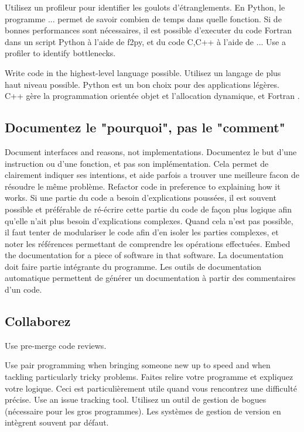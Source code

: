 \documentclass{article}
\begin{document}
Utilisez un profileur pour identifier les goulots d'étranglements. En Python, le programme ... permet de savoir combien de temps dans quelle fonction. Si de bonnes performances sont nécessaires, il est possible d'executer du code Fortran dans un script Python à l'aide de f2py, et du code C,C++ à l'aide de ...
    Use a profiler to identify bottlenecks.
    
    Write code in the highest-level language possible.
Utilisez un langage de plus haut niveau possible. Python est un bon choix pour des applications légères. C++ gère la programmation orientée objet et l'allocation dynamique, et Fortran .

\subsection{Documentez le "pourquoi", pas le "comment"}

    Document interfaces and reasons, not implementations.
Documentez le but d'une instruction ou d'une fonction, et pas son implémentation. Cela permet de clairement indiquer ses intentions, et aide parfois a trouver une meilleure facon de résoudre le même problème.
    Refactor code in preference to explaining how it works.
Si une partie du code a besoin d'explications poussées, il est souvent possible et préférable de ré-écrire cette partie du code de façon plus logique afin qu'elle n'ait plus besoin d'explications complexes. Quand cela n'est pas possible, il faut tenter de modulariser le code afin d'en isoler les parties complexes, et noter les références permettant de comprendre les opérations effectuées.
    Embed the documentation for a piece of software in that software.
La documentation doit faire partie intégrante du programme. Les outils de documentation automatique permettent de générer un documentation à partir des commentaires d'un code.

\subsection{Collaborez}

    Use pre-merge code reviews.
    
    Use pair programming when bringing someone new up to speed and when tackling particularly tricky problems.
Faites relire votre programme et expliquez votre logique. Ceci est particulièrement utile quand vous rencontrez une difficulté précise.
    Use an issue tracking tool.
Utilisez un outil de gestion de bogues (nécessaire pour les gros programmes). Les systèmes de gestion de version en intègrent souvent par défaut.
\end{document}
